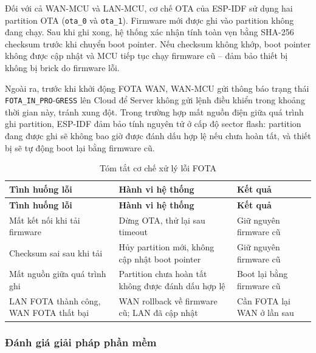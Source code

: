                 Đối với cả WAN-MCU và LAN-MCU, cơ chế OTA của ESP-IDF sử dụng hai partition OTA (\texttt{ota\_0} và \texttt{ota\_1}). Firmware mới được ghi vào partition không đang chạy. Sau khi ghi xong, hệ thống xác nhận tính toàn vẹn bằng SHA-256 checksum trước khi chuyển boot pointer. Nếu checksum không khớp, boot pointer không được cập nhật và MCU tiếp tục chạy firmware cũ -- đảm bảo thiết bị không bị brick do firmware lỗi.
                
                Ngoài ra, trước khi khởi động FOTA WAN, WAN-MCU gửi thông báo trạng thái \texttt{FOTA\_IN\_PRO}-\texttt{GRESS} lên Cloud để Server không gửi lệnh điều khiển trong khoảng thời gian này, tránh xung đột. Trong trường hợp mất nguồn điện giữa quá trình ghi partition, ESP-IDF đảm bảo tính nguyên tử ở cấp độ sector flash: partition đang được ghi sẽ không bao giờ được đánh dấu hợp lệ nếu chưa hoàn tất, và thiết bị sẽ tự động boot lại bằng firmware cũ.
                
                \begin{longtable}{|p{}|p{}|p{}|}
                    \caption{Tóm tắt cơ chế xử lý lỗi FOTA}
                    \label{tab:fota_error} \\
                    \hline
                    \textbf{Tình huống lỗi} & \textbf{Hành vi hệ thống} & \textbf{Kết quả} \\ \hline
                    \endfirsthead
                    \hline
                    \textbf{Tình huống lỗi} & \textbf{Hành vi hệ thống} & \textbf{Kết quả} \\ \hline
                    \endhead
                    Mất kết nối khi tải firmware & Dừng OTA, thử lại sau timeout & Giữ nguyên firmware cũ \\ \hline
                    Checksum sai sau khi tải & Hủy partition mới, không cập nhật boot pointer & Giữ nguyên firmware cũ \\ \hline
                    Mất nguồn giữa quá trình ghi & Partition chưa hoàn tất không được đánh dấu hợp lệ & Boot lại bằng firmware cũ \\ \hline
                    LAN FOTA thành công, WAN FOTA thất bại & WAN rollback về firmware cũ; LAN đã cập nhật & Cần FOTA lại WAN ở lần sau \\ \hline
                \end{longtable}
                
        \subsubsection{Đánh giá giải pháp phần mềm}
        
